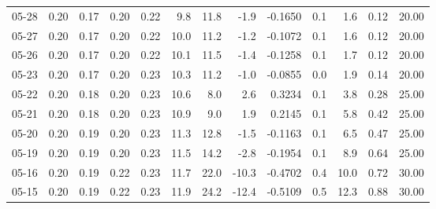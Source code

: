 \begin{threeparttable}
{\begin{tabular}{lrrrrrrrrrrrr}
  05-28 &          0.20 &          0.17 &          0.20 &        0.22 &                 9.8 &                11.8 &       -1.9 &      -0.1650 &                 0.1 &              1.6 &            0.12 &                  20.00 \\
  05-27 &          0.20 &          0.17 &          0.20 &        0.22 &                10.0 &                11.2 &       -1.2 &      -0.1072 &                 0.1 &              1.6 &            0.12 &                  20.00 \\
  05-26 &          0.20 &          0.17 &          0.20 &        0.22 &                10.1 &                11.5 &       -1.4 &      -0.1258 &                 0.1 &              1.7 &            0.12 &                  20.00 \\
  05-23 &          0.20 &          0.17 &          0.20 &        0.23 &                10.3 &                11.2 &       -1.0 &      -0.0855 &                 0.0 &              1.9 &            0.14 &                  20.00 \\
  05-22 &          0.20 &          0.18 &          0.20 &        0.23 &                10.6 &                 8.0 &        2.6 &       0.3234 &                 0.1 &              3.8 &            0.28 &                  25.00 \\
  05-21 &          0.20 &          0.18 &          0.20 &        0.23 &                10.9 &                 9.0 &        1.9 &       0.2145 &                 0.1 &              5.8 &            0.42 &                  25.00 \\
  05-20 &          0.20 &          0.19 &          0.20 &        0.23 &                11.3 &                12.8 &       -1.5 &      -0.1163 &                 0.1 &              6.5 &            0.47 &                  25.00 \\
  05-19 &          0.20 &          0.19 &          0.20 &        0.23 &                11.5 &                14.2 &       -2.8 &      -0.1954 &                 0.1 &              8.9 &            0.64 &                  25.00 \\
  05-16 &          0.20 &          0.19 &          0.22 &        0.23 &                11.7 &                22.0 &      -10.3 &      -0.4702 &                 0.4 &             10.0 &            0.72 &                  30.00 \\
  05-15 &          0.20 &          0.19 &          0.22 &        0.23 &                11.9 &                24.2 &      -12.4 &      -0.5109 &                 0.5 &             12.3 &            0.88 &                  30.00 \\

\end{tabular}}
\end{threeparttable}
